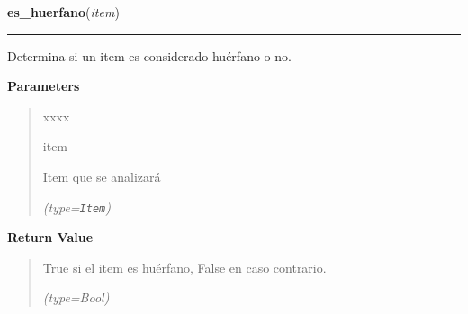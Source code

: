 \hspace{.8\funcindent}\begin{boxedminipage}{\funcwidth}

    \raggedright \textbf{es\_huerfano}(\textit{item})

    \vspace{-1.5ex}

    \rule{\textwidth}{0.5\fboxrule}
\setlength{\parskip}{2ex}
    Determina si un item es considerado huérfano o no.

\setlength{\parskip}{1ex}
      \textbf{Parameters}
      \vspace{-1ex}

      \begin{quote}
        \begin{Ventry}{xxxx}

          \item[item]

          Item que se analizará

            {\it (type=\texttt{Item})}

        \end{Ventry}

      \end{quote}

      \textbf{Return Value}
    \vspace{-1ex}

      \begin{quote}
      True si el item es huérfano, False en caso contrario.

      {\it (type=Bool)}

      \end{quote}

    \end{boxedminipage}

    \label{saip:lib:func:opuesto}

    \vspace{0.5ex}

